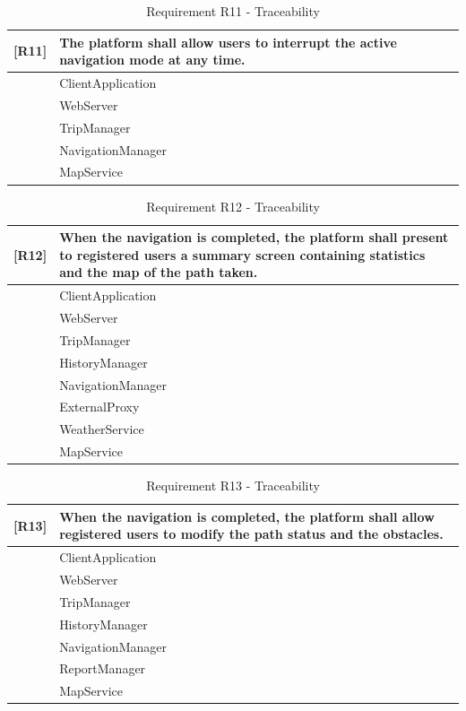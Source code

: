 \begin{table}[H]
    \centering
    \begin{tabular}{|p{1cm}|p{14cm}|}
    \hline
    \textbf{[R11]} & \textbf{The platform shall allow users to interrupt the active navigation mode at any time.} \\ \hline
    [C1] & ClientApplication \\ \hline
    [C2] & WebServer \\ \hline
    [C11] & TripManager \\ \hline
    [C13] & NavigationManager \\ \hline
    [E2] & MapService \\ \hline
    \end{tabular}
    \caption{Requirement R11 - Traceability}
    \label{tab:RT11}
\end{table}

\begin{table}[H]
    \centering
    \begin{tabular}{|p{1cm}|p{14cm}|}
    \hline
    \textbf{[R12]} & \textbf{When the navigation is completed, the platform shall present to registered users a summary screen
    containing statistics and the map of the path taken.} \\ \hline
    [C1] & ClientApplication \\ \hline
    [C2] & WebServer \\ \hline
    [C11] & TripManager \\ \hline
    [C12] & HistoryManager \\ \hline
    [C13] & NavigationManager \\ \hline
    [C17] & ExternalProxy \\ \hline
    [E1] & WeatherService \\ \hline
    [E2] & MapService \\ \hline
    \end{tabular}
    \caption{Requirement R12 - Traceability}
    \label{tab:RT12}
\end{table}

\begin{table}[H]
    \centering
    \begin{tabular}{|p{1cm}|p{14cm}|}
    \hline
    \textbf{[R13]} & \textbf{When the navigation is completed, the platform shall allow registered users to modify the path
    status and the obstacles.} \\ \hline
    [C1] & ClientApplication \\ \hline
    [C2] & WebServer \\ \hline
    [C11] & TripManager \\ \hline
    [C12] & HistoryManager \\ \hline
    [C13] & NavigationManager \\ \hline
    [C14] & ReportManager \\ \hline
    [E2] & MapService \\ \hline
    \end{tabular}
    \caption{Requirement R13 - Traceability}
    \label{tab:RT13}
\end{table}


